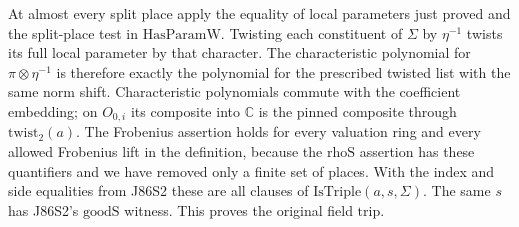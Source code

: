At almost every split place apply the equality of local parameters
just proved and the split-place test in $\mathrm{HasParamW}$. Twisting
each constituent of $\Sigma$ by $\eta^{-1}$ twists its full
local parameter by that character. The characteristic polynomial
for $\pi\otimes\eta^{-1}$ is therefore exactly the polynomial for
the prescribed twisted list with the same norm shift. Characteristic
polynomials commute with the coefficient embedding; on $O_{0,i}$
its composite into $\mathbb C$ is the pinned composite through
$\mathrm{twist}_2(a)$. The Frobenius assertion holds for every
valuation ring and every allowed Frobenius lift in the definition,
because the $\mathrm{rhoS}$ assertion has these quantifiers and
we have removed only a finite set of places. With the index and
side equalities from J86S2 these are all clauses of
$\mathrm{IsTriple}(a,s,\Sigma)$. The same $s$ has J86S2's
$\mathrm{goodS}$ witness. This proves the original field
$\mathrm{trip}$.
